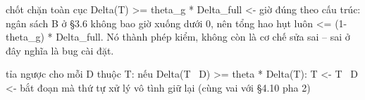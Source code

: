 \documentclass[11pt,a4paper]{article}
\begin{document}
\begin{dia}
chốt chặn toàn cục    Delta(T)  >=  theta_g * Delta_full
                      <- giờ đúng theo cấu trúc: ngân sách B ở §3.6 không bao
                         giờ xuống dưới 0, nên tổng hao hụt luôn <= (1-theta_g)
                         * Delta_full. Nó thành phép kiểm, không còn là cơ chế
                         sửa sai -- sai ở đây nghĩa là bug cài đặt.

tỉa ngược             cho mỗi D thuộc T:
                          nếu  Delta(T \ {D}) >= theta * Delta(T):  T <- T \ {D}
                      <- bắt đoạn mà thứ tự xử lý vô tình giữ lại
                         (cùng vai với §4.10 pha 2)
\end{dia}

\end{document}
